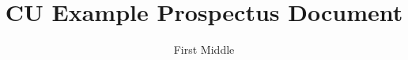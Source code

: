 \documentclass[defaultstyle,11pt]{prospectus}
\title{CU Example Prospectus Document}
\author{First Middle}{Last}
\begin{document}
\graphicspath{{\subfix{figures}}}



















\appendix

\end{document}
